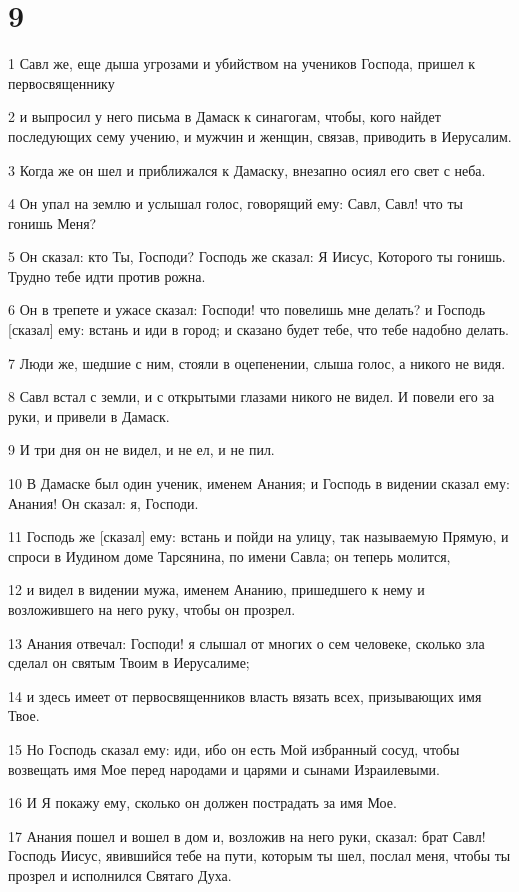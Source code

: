 \chapter{9}

\par 1 Савл же, еще дыша угрозами и убийством на учеников Господа, пришел к первосвященнику
\par 2 и выпросил у него письма в Дамаск к синагогам, чтобы, кого найдет последующих сему учению, и мужчин и женщин, связав, приводить в Иерусалим.
\par 3 Когда же он шел и приближался к Дамаску, внезапно осиял его свет с неба.
\par 4 Он упал на землю и услышал голос, говорящий ему: Савл, Савл! что ты гонишь Меня?
\par 5 Он сказал: кто Ты, Господи? Господь же сказал: Я Иисус, Которого ты гонишь. Трудно тебе идти против рожна.
\par 6 Он в трепете и ужасе сказал: Господи! что повелишь мне делать? и Господь [сказал] ему: встань и иди в город; и сказано будет тебе, что тебе надобно делать.
\par 7 Люди же, шедшие с ним, стояли в оцепенении, слыша голос, а никого не видя.
\par 8 Савл встал с земли, и с открытыми глазами никого не видел. И повели его за руки, и привели в Дамаск.
\par 9 И три дня он не видел, и не ел, и не пил.
\par 10 В Дамаске был один ученик, именем Анания; и Господь в видении сказал ему: Анания! Он сказал: я, Господи.
\par 11 Господь же [сказал] ему: встань и пойди на улицу, так называемую Прямую, и спроси в Иудином доме Тарсянина, по имени Савла; он теперь молится,
\par 12 и видел в видении мужа, именем Ананию, пришедшего к нему и возложившего на него руку, чтобы он прозрел.
\par 13 Анания отвечал: Господи! я слышал от многих о сем человеке, сколько зла сделал он святым Твоим в Иерусалиме;
\par 14 и здесь имеет от первосвященников власть вязать всех, призывающих имя Твое.
\par 15 Но Господь сказал ему: иди, ибо он есть Мой избранный сосуд, чтобы возвещать имя Мое перед народами и царями и сынами Израилевыми.
\par 16 И Я покажу ему, сколько он должен пострадать за имя Мое.
\par 17 Анания пошел и вошел в дом и, возложив на него руки, сказал: брат Савл! Господь Иисус, явившийся тебе на пути, которым ты шел, послал меня, чтобы ты прозрел и исполнился Святаго Духа.
